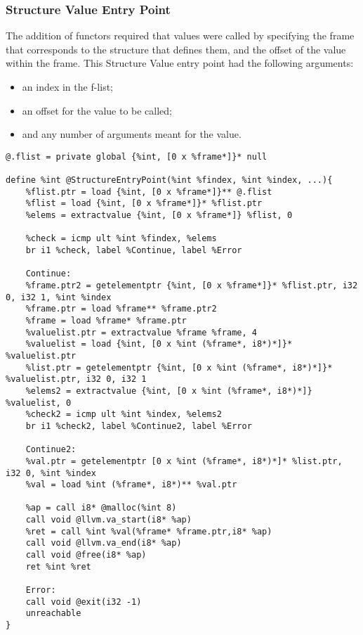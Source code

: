 \subsubsection{Structure Value Entry Point}
The addition of functors required that values were called by specifying the frame that corresponds to the structure that defines them, and the offset of the value within the frame.
This Structure Value entry point had the following arguments:
\begin{itemize}
\item an index in the f-list;
\item an offset for the value to be called;
\item and any number of arguments meant for the value.
\end{itemize}

\begin{lstlisting}
@.flist = private global {%int, [0 x %frame*]}* null

define %int @StructureEntryPoint(%int %findex, %int %index, ...){
    %flist.ptr = load {%int, [0 x %frame*]}** @.flist
    %flist = load {%int, [0 x %frame*]}* %flist.ptr
    %elems = extractvalue {%int, [0 x %frame*]} %flist, 0
    
    %check = icmp ult %int %findex, %elems
    br i1 %check, label %Continue, label %Error
    
    Continue:
    %frame.ptr2 = getelementptr {%int, [0 x %frame*]}* %flist.ptr, i32 0, i32 1, %int %index
    %frame.ptr = load %frame** %frame.ptr2
    %frame = load %frame* %frame.ptr
    %valuelist.ptr = extractvalue %frame %frame, 4
    %valuelist = load {%int, [0 x %int (%frame*, i8*)*]}* %valuelist.ptr
    %list.ptr = getelementptr {%int, [0 x %int (%frame*, i8*)*]}* %valuelist.ptr, i32 0, i32 1
    %elems2 = extractvalue {%int, [0 x %int (%frame*, i8*)*]} %valuelist, 0
    %check2 = icmp ult %int %index, %elems2
    br i1 %check2, label %Continue2, label %Error
    
    Continue2:
    %val.ptr = getelementptr [0 x %int (%frame*, i8*)*]* %list.ptr, i32 0, %int %index
    %val = load %int (%frame*, i8*)** %val.ptr

    %ap = call i8* @malloc(%int 8)
    call void @llvm.va_start(i8* %ap)
    %ret = call %int %val(%frame* %frame.ptr,i8* %ap)
    call void @llvm.va_end(i8* %ap)
    call void @free(i8* %ap)
    ret %int %ret
    
    Error:
    call void @exit(i32 -1)
    unreachable
}
\end{lstlisting}
